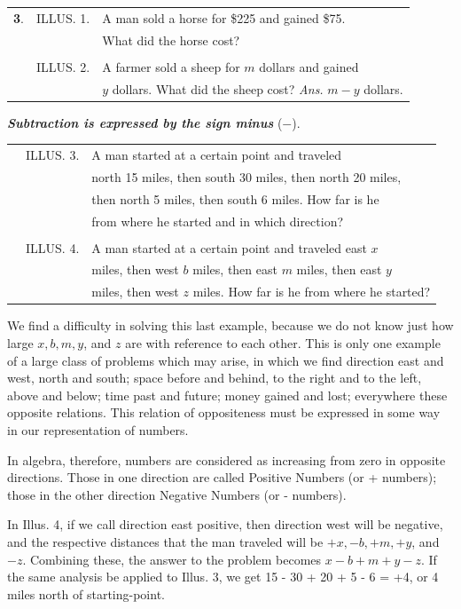 \documentclass{book}
\begin{document}
\begin{tabular}{cll}
\textbf{ 3}. &ILLUS. 1. & A man sold a horse for \$225 and gained
\$75.\\
& & What did the horse cost?\\
\\
&ILLUS. 2. & A farmer sold a sheep for $m$ dollars and gained\\
& & $y$ dollars. What did the sheep cost? \textit{Ans.} $m - y$
dollars.\\
\end{tabular}


\textit{\textbf{Subtraction is expressed by the sign minus}}
($-$).


\begin{tabular}{cll}
&ILLUS. 3. & A man started at a certain point and traveled\\
& & north 15 miles, then south 30 miles, then north 20 miles,\\
& &then north 5 miles, then south 6 miles. How far is he\\
& &from where he started and in which direction?\\
\\
&ILLUS. 4. & A man started at a certain point and traveled east $x$\\
& &miles, then west $b$ miles, then east $m$ miles, then east $y$\\
& &miles, then west $z$ miles. How far is he from where he started?\\
\end{tabular}


We find a difficulty in solving this last example, because we do
not know just how large $x, b, m, y$, and $z$ are with reference
to each other. This is only one example of a large class of
problems which may arise, in which we find direction east and
west, north and south; space before and behind, to the right and
to the left, above and below; time past and future; money gained
and lost; everywhere these opposite relations. This relation of
oppositeness must be expressed in some way in our representation
of numbers.

In algebra, therefore, numbers are considered as increasing from
zero in opposite directions. Those in one direction are called
Positive Numbers (or + numbers); those in the other direction
Negative Numbers (or - numbers).

In Illus. 4, if we call direction east positive, then direction
west will be negative, and the respective distances that the man
traveled will be $+x, - b, + m, + y$, and $-z$. Combining these,
the answer to the problem becomes $x - b + m + y - z$. If the same
analysis be applied to Illus. 3, we get 15 - 30 + 20 + 5 - 6 = +4,
or 4 miles north of starting-point.
\end{document}

